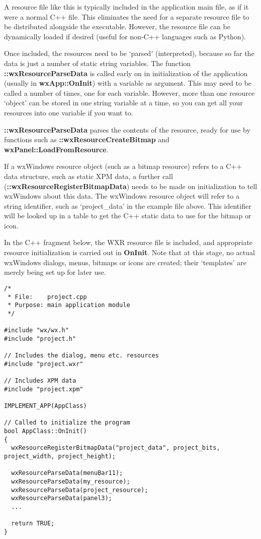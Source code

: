 A resource file like this is typically included in the application main file,
as if it were a normal C++ file. This eliminates the need for a separate
resource file to be distributed alongside the executable. However, the
resource file can be dynamically loaded if desired (useful for non-C++
languages such as Python).

Once included, the resources need to be `parsed' (interpreted), because
so far the data is just a number of static string variables. The function\rtfsp
{\bf ::wxResourceParseData} is called early on in initialization of the application
(usually in {\bf wxApp::OnInit}) with a variable as argument. This may need to be
called a number of times, one for each variable. However, more than one
resource `object' can be stored in one string variable at a time, so you can
get all your resources into one variable if you want to.

{\bf ::wxResourceParseData} parses the contents of the resource, ready for use
by functions such as {\bf ::wxResourceCreateBitmap} and {\bf wxPanel::LoadFromResource}.

If a wxWindows resource object (such as a bitmap resource) refers to a
C++ data structure, such as static XPM data, a further call ({\bf ::wxResourceRegisterBitmapData}) needs
to be made on initialization to tell
wxWindows about this data. The wxWindows resource object will refer to a
string identifier, such as `project\_data' in the example file above.
This identifier will be looked up in a table to get the C++ static data
to use for the bitmap or icon.

In the C++ fragment below, the WXR resource file is included,
and appropriate resource initialization is carried out in {\bf OnInit}.
Note that at this stage, no actual wxWindows dialogs, menus, bitmaps or
icons are created; their `templates' are merely being set up for later
use.

\begin{verbatim}
/*
 * File:    project.cpp
 * Purpose: main application module
 */

#include "wx/wx.h"
#include "project.h"

// Includes the dialog, menu etc. resources
#include "project.wxr"

// Includes XPM data
#include "project.xpm"

IMPLEMENT_APP(AppClass)

// Called to initialize the program
bool AppClass::OnInit()
{
  wxResourceRegisterBitmapData("project_data", project_bits, project_width, project_height);

  wxResourceParseData(menuBar11);
  wxResourceParseData(my_resource);
  wxResourceParseData(project_resource);
  wxResourceParseData(panel3);
  ...

  return TRUE;
}
\end{verbatim}

